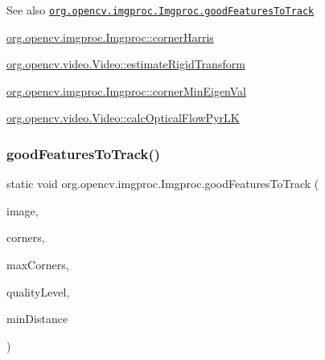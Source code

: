 \begin{DoxySeeAlso}{See also}
\href{http://docs.opencv.org/modules/imgproc/doc/feature_detection.html#goodfeaturestotrack}{\tt org.\+opencv.\+imgproc.\+Imgproc.\+good\+Features\+To\+Track} 

\mbox{\hyperlink{classorg_1_1opencv_1_1imgproc_1_1_imgproc_aff9b8e4b52de80802161886bd074cdca}{org.\+opencv.\+imgproc.\+Imgproc\+::corner\+Harris}} 

\mbox{\hyperlink{classorg_1_1opencv_1_1video_1_1_video_ad9c2fbb377a485b9619be2c78eaf7cee}{org.\+opencv.\+video.\+Video\+::estimate\+Rigid\+Transform}} 

\mbox{\hyperlink{classorg_1_1opencv_1_1imgproc_1_1_imgproc_a9a5a2f96d413cc9f1ce919942a150a41}{org.\+opencv.\+imgproc.\+Imgproc\+::corner\+Min\+Eigen\+Val}} 

\mbox{\hyperlink{classorg_1_1opencv_1_1video_1_1_video_af905ed0b09b612cdbfd3196135e40ef1}{org.\+opencv.\+video.\+Video\+::calc\+Optical\+Flow\+Pyr\+LK}} 
\end{DoxySeeAlso}
\mbox{\label{classorg_1_1opencv_1_1imgproc_1_1_imgproc_a1aae3383c84a2d787691a18c05962764}} 
\subsubsection{\texorpdfstring{good\+Features\+To\+Track()}{goodFeaturesToTrack()}\hspace{0.1cm}{\footnotesize\ttfamily [2/2]}}
{\footnotesize\ttfamily static void org.\+opencv.\+imgproc.\+Imgproc.\+good\+Features\+To\+Track (\begin{DoxyParamCaption}\item[{\mbox{\hyperlink{classorg_1_1opencv_1_1core_1_1_mat}{Mat}}}]{image,  }\item[{\mbox{\hyperlink{classorg_1_1opencv_1_1core_1_1_mat_of_point}{Mat\+Of\+Point}}}]{corners,  }\item[{int}]{max\+Corners,  }\item[{double}]{quality\+Level,  }\item[{double}]{min\+Distance }\end{DoxyParamCaption})\hspace{0.3cm}{\ttfamily [static]}}

